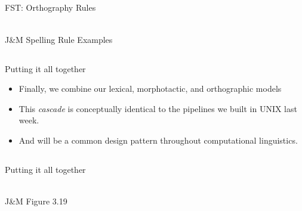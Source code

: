 \documentclass[9pt,xcolor=pdftex,dvipsnames,table]{beamer}
\begin{document}
\subsection{}
\begin{frame}{FST: Orthography Rules}
\begin{center}
	\\
	{\large J\&M Spelling Rule Examples}\\
\end{center}
\end{frame}

\subsection{}
\begin{frame}{Putting it all together}

\begin{itemize}
     \item Finally, we combine our lexical, morphotactic, and orthographic models
     \item This \emph{cascade} is conceptually identical to the pipelines we built in UNIX last week.
     \item And will be a common design pattern throughout computational linguistics.
\end{itemize}
\end{frame}

\subsection{}
\begin{frame}{Putting it all together}
\begin{center}
	\\
	{\large J\&M Figure 3.19}\\
\end{center}

\end{frame}
\end{document}
